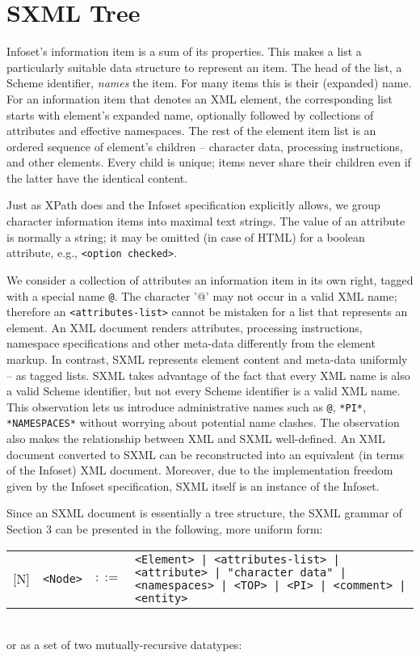 \documentclass[10pt]{article}
\begin{document}
\section{SXML Tree}
Infoset's information item is a sum of its properties. This makes
a list a particularly suitable data structure to represent an
item. The head of the list, a Scheme identifier, \emph{names} the
item. For many items this is their (expanded) name. For an information
item that denotes an XML element, the corresponding list starts with
element's expanded name, optionally followed by collections of
attributes and effective namespaces. The rest of the element item list
is an ordered sequence of element's children -- character data,
processing instructions, and other elements. Every child is unique;
items never share their children even if the latter have the identical
content.

Just as XPath does and the Infoset specification explicitly allows,
we group character information items into maximal text strings.  The
value of an attribute is normally a string; it may be omitted (in
case of HTML) for a boolean attribute, e.g., \texttt{<option checked>}.

We consider a collection of attributes an information item in its
own right, tagged with a special name \texttt{@}. The character '@'
may not occur in a valid XML name; therefore
an \texttt{<attributes-list>} cannot be mistaken for a list that represents an element. An XML
document renders attributes, processing instructions, namespace
specifications and other meta-data differently from the element
markup. In contrast, SXML represents element content and meta-data
uniformly -- as tagged lists.  SXML takes advantage of the fact that
every XML name is also a valid Scheme identifier, but not every Scheme
identifier is a valid XML name. This observation lets us introduce
administrative names such as \texttt{@}, \texttt{*PI*}, \texttt{*NAMESPACES*} without worrying about potential name
clashes. The observation also makes the relationship between XML and SXML
well-defined. An XML document converted to SXML can be reconstructed
into an equivalent (in terms of the Infoset) XML document. Moreover, due
to the implementation freedom given by the Infoset specification, SXML
itself is an instance of the Infoset.

Since an SXML document is essentially a tree structure, the SXML grammar of Section 3 can be presented in the following, more uniform form:

\begin{tabular}{rrcp{2.8in}}
{[}N{]} & \texttt{<Node>} &  $::=$ & \texttt{<Element> | <attributes-list> | <attribute> | "character data" | <namespaces> | <TOP> | <PI> | <comment> | <entity> } \\
\end{tabular}
\\
or as a set of two mutually-recursive datatypes:
\end{document}
